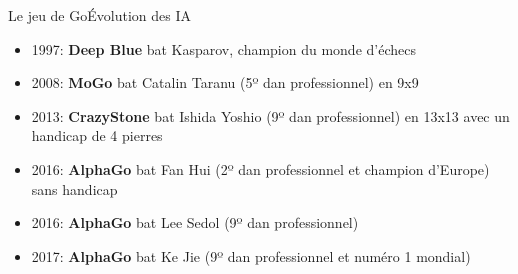 \begin{frame}{Le jeu de Go}{Évolution des IA}
    \begin{itemize}
        \item 1997: \textbf{Deep Blue} bat Kasparov, champion du monde d'échecs
        \item 2008: \textbf{MoGo} bat Catalin Taranu (5º dan professionnel) en 9x9
        \item 2013: \textbf{CrazyStone} bat Ishida Yoshio (9º dan professionnel) en 13x13 avec un handicap de 4 pierres
        \item 2016: \textbf{AlphaGo} bat Fan Hui (2º dan professionnel et champion d'Europe) sans handicap
        \item 2016: \textbf{AlphaGo} bat Lee Sedol (9º dan professionnel)
        \item 2017: \textbf{AlphaGo} bat Ke Jie (9º dan professionnel et numéro 1 mondial)
    \end{itemize}
\end{frame}
